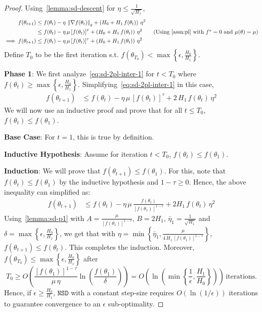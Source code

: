 \documentclass{article}
\newcommand{\norm}[1]{\left\|#1 \right\|}
\newcommand{\tht}{\theta_t}
\newcommand{\thtt}{\theta_{t+1}}
\newcommand{\NSD}{\texttt{NSD}}
\begin{document}
\nsd*
\begin{proof}
Using~\cref{lemma:sd-descent} for $\eta \leq \frac{1}{\sqrt{H_1}}$, 
\begin{align}
f(\thtt) & \leq f(\tht) - \eta \,  \norm{\nabla f(\tht)}_{q} +\left(H_0 + H_1 \, f(\tht) \right) \, \eta^2  \nonumber \\
& \leq f(\tht) - \eta \,  \mu \, [f(\tht)]^{\tau} +\left(H_0 + H_1 \, f(\tht) \right) \, \eta^2  \tag{Using~\cref{assn:pl} with $f^* = 0$ and $\mu(\theta) = \mu$} \\
\implies f(\thtt) & \leq f(\tht) - \eta \,  \mu \, [f(\tht)]^{\tau} +\left(H_0 + H_1 \, f(\tht) \right) \, \eta^2 \label{eq:sd-2pl-inter-1}
\end{align}
Define $T_0$ to be the first iteration s.t. $f(\theta_{T_0}) < \max\left\{\epsilon, \frac{H_0}{H_1} \right\}$.

\textbf{Phase 1}: We first analyze~\cref{eq:sd-2pl-inter-1} for $t < T_0$ where $f(\theta_t) \geq \max\left\{\epsilon, \frac{H_0}{H_1} \right\}$. Simplifying~\cref{eq:sd-2pl-inter-1} in this case, 
\begin{align*}
f(\thtt) & \leq f(\tht) - \eta \,  \mu \, [f(\tht)]^{\tau} + 2 \, H_1 \, f(\tht) \, \eta^2 
\end{align*}
We will now use an inductive proof and prove that for all $t \leq T_0$, $f(\tht) \leq f(\theta_1)$. 

\textbf{Base Case}: For $t = 1$, this is true by definition. 

\textbf{Inductive Hypothesis}: Assume for iteration $t < T_0$, $f(\tht) \leq f(\theta_1)$.

\textbf{Induction}: We will prove that $f(\thtt) \leq f(\theta_1)$. For this, note that $f(\tht) \leq f(\theta_1)$ by the inductive hypothesis and $1 - \tau \geq 0$. Hence, the above inequality can simplified as:
\begin{align*}
f(\thtt) & \leq f(\tht) - \eta \,  \mu \, \frac{f(\tht)}{[f(\theta_1)]^{1 - \tau}} + 2 H_1 \, f(\tht) \, \eta^2 
\end{align*}
Using~\cref{lemma:sd-p1} with $A = \frac{\mu}{[f(\theta_1)]^{1 - \tau}}$, $B = 2 H_1$, $\bar{\eta}_1 = \frac{1}{\sqrt{H_1}}$ and $\delta = \max\left\{\epsilon, \frac{H_0}{H_1} \right\}$, we get that with $\eta = \min\left\{\bar{\eta}_1, \frac{\mu}{4 \, H_1 \, [f(\theta_1)]^{1 - \tau}} \right\}$, $f(\thtt) \leq f(\tht)$. This completes the induction. Moreover, $f(\theta_{T_0}) \leq \max\left\{\epsilon, \frac{H_0}{H_1} \right\}$ after 
\[
T_0 \geq O \left(\frac{[f(\theta_1)]^{1 - \tau}}{\mu \, \eta} \ln\left(\frac{f(\theta_1)}{\delta}\right) \right) = O \left(\ln\left(\min\left\{\frac{1}{\epsilon}, \frac{H_1}{H_0} \right\} \right) \right)\, \text{iterations.}
\]
Hence, if $\epsilon \geq \frac{H_0}{H_1}$, $\NSD$ with a constant step-size requires $O(\ln(1/\epsilon))$ iterations to guarantee convergence to an $\epsilon$ sub-optimality. 


\end{proof}
\end{document}
